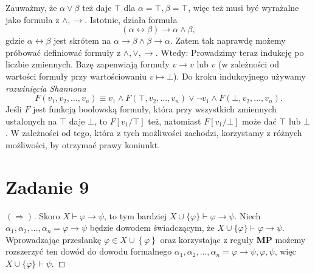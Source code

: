 Zauważmy, że \( \alpha \vee \beta \) też daje \( \top \) dla \( \alpha = \top, \beta = \top \), więc też musi być wyrażalne jako formuła z \( \wedge, \to \). Istotnie, działa formuła
\[ 
    (\alpha \leftrightarrow \beta) \to \alpha \wedge \beta,
\]
gdzie \(\alpha \leftrightarrow \beta\) jest skrótem na \( \alpha \to \beta \wedge \beta \to \alpha \). Zatem tak naprawdę możemy próbować definiować formuły z \( \wedge, \vee, \to \). Wtedy:
Prowadzimy teraz indukcję po liczbie zmiennych. Bazę zapenwiają formuły \( v \to v \) lub \( v \) (w zależności od wartości formuły przy wartościowaniu \( v \mapsto \bot \)). Do kroku indukcyjnego używamy \textit{rozwinięcia Shannona}
\[ 
    F(v_1, v_2, \ldots, v_n) \equiv v_1 \wedge F(\top, v_2, \ldots, v_n) \vee \neg v_1 \wedge F(\bot, v_2, \ldots, v_n).
\]
Jeśli \( F \) jest funkcją boolowską formuły, która przy wszystkich zmiennych ustalonych na \( \top \) daje \( \bot \), to \( F[v_1/\top] \) też, natomiast \( F[v_1/\bot] \) może dać \( \top \) lub \( \bot \). W zależności od tego, która z tych możliwości zachodzi, korzystamy z różnych możliwości, by otrzymać prawy koniunkt.

\newpage

\section*{Zadanie 9}

\begin{proof}[\( (\Rightarrow) \)]
    Skoro \( X \vdash \varphi \to \psi \), to tym bardziej \( X \cup \{\varphi\} \vdash \varphi \to \psi \). Niech \( \alpha_1, \alpha_2, \ldots, \alpha_n = \varphi \to \psi \) będzie dowodem świadczącym, że \( X \cup \{ \varphi \} \vdash \varphi \to \psi \). Wprowadzając przesłankę \( \varphi \in X \cup \left\{ \varphi \right\} \) oraz korzystając z reguły \textbf{MP} możemy rozszerzyć ten dowód do dowodu formalnego \( \alpha_1, \alpha_2, \ldots, \alpha_n = \varphi \to \psi, \varphi, \psi \), więc \( X \cup \{\varphi\} \vdash \psi \).
\end{proof}

